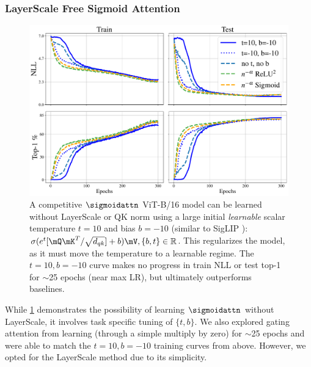 \subsubsection{LayerScale Free Sigmoid Attention}
\label{sec:layerscale_free_sigmoid}
\begin{figure}[ht]
  \begin{minipage}{0.58\textwidth}
    \centering
    \includegraphics[width=\linewidth]{figures/train_test_metrics_clean.pdf}
  \end{minipage}%
  \hfill
  \begin{minipage}{0.4\textwidth}
    \caption{A competitive $\sigmoidattn$ ViT-B/16 model can be learned without LayerScale or QK norm using a large initial \emph{learnable} scalar temperature $t=10$ and bias $b=-10$ (similar to SigLIP \citep{DBLP:journals/corr/abs-2303-15343}): $\sigma(e^t [\mQ\mK^T / \sqrt{d_{qk}}] + b)\mV, \{b, t\} \in \mathbb{R}$. This regularizes the model, as it must move the temperature to a learnable regime. The $t=10,b=-10$ curve makes no progress in train NLL or test top-1 for $\sim$25 epochs (near max LR), but ultimately outperforms baselines.}    
    \label{fig:layerscale_free_sigmoid}
  \end{minipage}  
\end{figure}
While \cref{fig:layerscale_free_sigmoid} demonstrates the possibility of learning $\sigmoidattn$ without LayerScale, it involves task specific tuning of $\{t, b\}$. We also explored gating attention from learning (through a simple multiply by zero) for $\sim$25 epochs and were able to match the $t = 10, b = -10$ training curves from above. However, we opted for the LayerScale method due to its simplicity.
